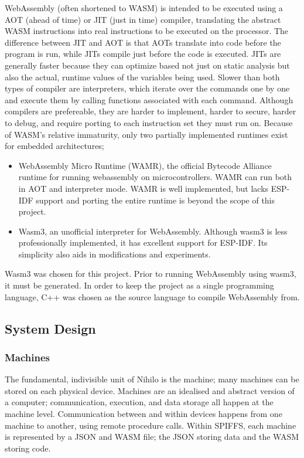 \documentclass{article}
\begin{document}
WebAssembly (often shortened to WASM) is intended to be executed using a AOT (ahead of time)  or JIT (just in time) compiler, translating the abstract WASM instructions into real instructions to be executed on the processor.
The difference between JIT and AOT is that AOTs translate into code before the program is run, while JITs compile just before the code is executed.
JITs are generally faster because they can optimize based not just on static analysis but also the actual, runtime values of the variables being used.
Slower than both types of compiler are interpreters, which iterate over the commands one by one and execute them by calling functions associated with each command.
Although compilers are prefereable, they are harder to implement, harder to secure, harder to debug, and require porting to each instruction set they must run on.
Because of WASM's relative immaturity, only two partially implemented runtimes exist for embedded architectures;
\begin{itemize}
\item WebAssembly Micro Runtime (WAMR), the official Bytecode Alliance runtime for running webassembly on microcontrollers.
WAMR can run both in AOT and interpreter mode.
WAMR is well implemented, but lacks ESP-IDF support and porting the entire runtime is beyond the scope of this project.
\item Wasm3, an unofficial interpreter for WebAssembly. 
Although wasm3 is less professionally implemented, it has excellent support for ESP-IDF.
Its simplicity also aids in modifications and experiments. 
\end{itemize}

Wasm3 was chosen for this project. Prior to running WebAssembly using wasm3, it must be generated. In order to keep the project as a single programming language, C++ was chosen as the source language to compile WebAssembly from.

\subsection{System Design}
\subsubsection{Machines}

The fundamental, indivisible unit of Nihilo is the machine; many machines can be stored on each physical device. Machines are an idealised and abstract version of a computer; communication, execution, and data storage all happen at the machine level. Communication between and within devices happens from one machine to another, using remote procedure calls. Within SPIFFS, each machine is represented by a JSON and WASM file; the JSON storing data and the WASM storing code.
\end{document}
